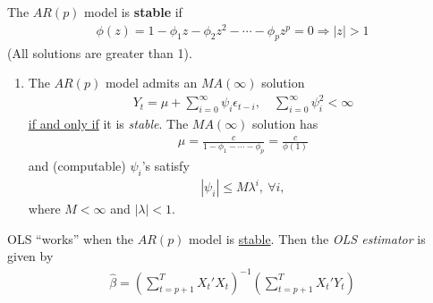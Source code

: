 \documentclass[11pt]{elegantbook}
\begin{document}
\begin{definition}[Stability of $AR(p)$]
    The $AR(p)$ model is \textbf{stable} if \begin{equation}
        \begin{aligned}
            \phi(z)=1-\phi_1 z - \phi_2 z^2 - \cdots - \phi_p z^p=0 \Rightarrow |z|>1
        \end{aligned}
        \nonumber
    \end{equation}
    (All solutions are greater than 1).
\end{definition}

\begin{enumerate}[$\circ$]
    \item The $AR(p)$ model admits an $MA(\infty)$ solution
    \begin{equation}
        \begin{aligned}
            Y_t=\mu+\sum_{i=0}^\infty \psi_i\epsilon_{t-i},\quad \sum_{i=0}^\infty \psi_i^2<\infty
        \end{aligned}
        \nonumber
    \end{equation}
    \underline{if and only if} it is \textit{stable}.
    The $MA(\infty)$ solution has
    \begin{equation}
        \begin{aligned}
            \mu=\frac{c}{1-\phi_1-\cdots-\phi_p}=\frac{c}{\phi(1)}
        \end{aligned}
        \nonumber
    \end{equation}
    and (computable) $\psi_i$'s satisfy
    \begin{equation}
        \begin{aligned}
            |\psi_i|\leq M \lambda^i,\ \forall i,
        \end{aligned}
        \nonumber
    \end{equation}
    where $M<\infty$ and $|\lambda|<1$.
\end{enumerate}
\begin{claim}
    OLS ``works'' when the $AR(p)$ model is \underline{stable}. Then the \textit{OLS estimator} is given by
    \begin{equation}
        \begin{aligned}
            \hat{\beta}=\left(\sum_{t=p+1}^TX_t'X_t\right)^{-1}\left(\sum_{t=p+1}^TX_t'Y_t\right)
        \end{aligned}
        \nonumber
    \end{equation}
\end{claim}
\end{document}
